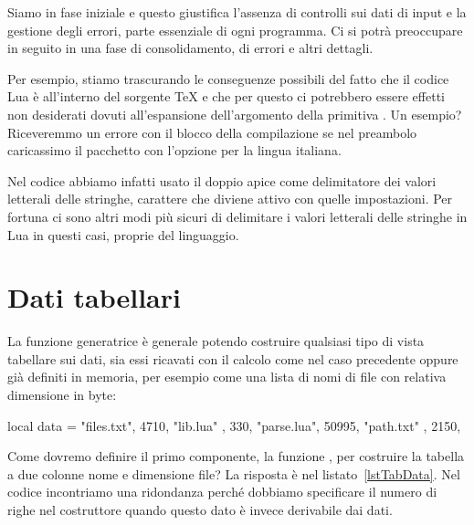 Siamo in fase iniziale e questo giustifica l'assenza di controlli sui dati di
input e la gestione degli errori, parte essenziale di ogni programma. Ci si
potrà preoccupare in seguito in una fase di consolidamento, di errori e altri
dettagli.

Per esempio, stiamo trascurando le conseguenze possibili del fatto che il codice
Lua è all'interno del sorgente \TeX{} e che per questo ci potrebbero essere
effetti non desiderati dovuti all'espansione dell'argomento della primitiva
. Un esempio? Riceveremmo un errore con il blocco della
compilazione se nel preambolo caricassimo il pacchetto  con
l'opzione  per la lingua italiana.

Nel codice abbiamo infatti usato il doppio apice come delimitatore dei valori
letterali delle stringhe, carattere che diviene attivo con quelle impostazioni.
Per fortuna ci sono altri modi più sicuri di delimitare i valori letterali delle
stringhe in Lua in questi casi, proprie del linguaggio.


\section{Dati tabellari}

La funzione generatrice è generale potendo costruire qualsiasi tipo di vista
tabellare sui dati, sia essi ricavati con il calcolo come nel caso precedente
oppure già definiti in memoria, per esempio come una lista di nomi di file con
relativa dimensione in byte:
\begin{lines}
local data = {
    {"files.txt",  4710},
    {"lib.lua"  ,   330},
    {"parse.lua", 50995},
    {"path.txt" ,  2150},
}
\end{lines}

Come dovremo definire il primo componente, la funzione , per
costruire la tabella a due colonne nome e dimensione file? La risposta è nel
listato~\ref{lstTabData}. Nel codice incontriamo una ridondanza perché dobbiamo
specificare il numero di righe nel costruttore  quando questo dato è
invece derivabile dai dati. 

